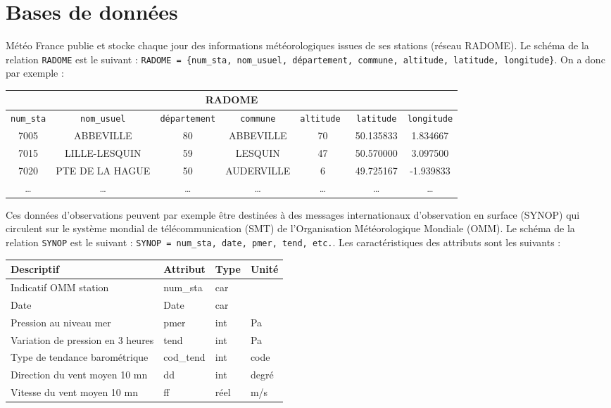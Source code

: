 
\section*{Bases de données}
Météo France publie et stocke chaque jour des informations météorologiques issues de ses stations (réseau RADOME).
Le schéma de la relation \texttt{RADOME} est le suivant : 
\texttt{RADOME = \{num\_sta, nom\_usuel, département, commune, altitude, latitude, longitude\}}. On a donc par exemple :
\begin{center}
\begin{tabular}{ccccccc}
\hline
\multicolumn{7}{c}{RADOME} \\
\hline\texttt{num\_sta} & \texttt{nom\_usuel} & \texttt{département} & \texttt{commune} & \texttt{altitude	} & \texttt{latitude} & \texttt{longitude} \\
\hline\hline
7005&	ABBEVILLE&	80&	ABBEVILLE&	70&	50.135833&	1.834667 \\
7015&	LILLE-LESQUIN&	59&	LESQUIN&	47&	50.570000&	3.097500\\
7020&	PTE DE LA HAGUE&	50&	AUDERVILLE	&6&	49.725167&	-1.939833\\
…&	…&	…&	…&	…&	…&	… \\
\hline
\end{tabular}
\end{center}
Ces données d'observations peuvent par exemple être destinées à des messages internationaux d’observation en surface (SYNOP) qui circulent sur le système mondial de télécommunication (SMT) de l’Organisation Météorologique Mondiale (OMM). 
Le schéma de la relation \texttt{SYNOP} est le suivant : \texttt{SYNOP = {num\_sta, date, pmer, tend, etc.}}. Les caractéristiques des attributs sont les suivants :
\begin{center}
\begin{tabular}{llll}
\hline
Descriptif&	Attribut&	Type&	 Unité\\
\hline
\hline
Indicatif OMM station&	num\_sta& car&	\\
Date&	Date	&car&	\\
Pression au niveau mer&	pmer&	int&	Pa\\
Variation de pression en 3 heures&	tend&	int&	Pa\\
Type de tendance barométrique&	cod\_tend&	int&	code\\
Direction du vent moyen 10 mn&	dd&	 int&	degré\\
Vitesse du vent moyen 10 mn&	ff&	réel& 	m/s \\
\hline
\end{tabular}
\end{center}

